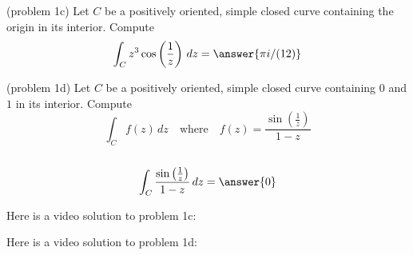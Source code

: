\documentclass[handout]{ximera}
\begin{document}
\begin{problem}(problem 1c)
Let $C$ be a positively oriented, simple closed curve containing the origin in its interior. Compute
\[
\int_C z^3\cos\left(\frac{1}{z}\right) \, dz = \answer{\pi i/(12)}
\]

\end{problem}

\begin{problem}(problem 1d)
Let $C$ be a positively oriented, simple closed curve containing $0$ and $1$ in its interior. Compute
\[
\int_C f(z) \, dz \quad \text{where} \quad f(z) = \frac{\sin\left(\frac{1}{z}\right)}{1-z}
\]
{}\\
\[
 \int_C \frac{\sin\left(\frac{1}{z}\right)}{1-z} \, dz = \answer{0}
 \]

\end{problem}


Here is a video solution to problem 1c:\\
\begin{foldable}
\end{foldable}

Here is a video solution to problem 1d:\\
\begin{foldable}
\end{foldable}
\end{document}
